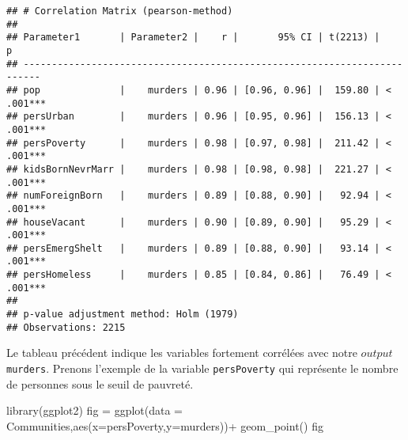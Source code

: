 \documentclass[
]{book}
\newenvironment{Shaded}{\begin{snugshade}}{\end{snugshade}}
\newcommand{\AttributeTok}[1]{\textcolor[rgb]{0.77,0.63,0.00}{#1}}
\newcommand{\CommentTok}[1]{\textcolor[rgb]{0.56,0.35,0.01}{\textit{#1}}}
\newcommand{\FloatTok}[1]{\textcolor[rgb]{0.00,0.00,0.81}{#1}}
\newcommand{\FunctionTok}[1]{\textcolor[rgb]{0.00,0.00,0.00}{#1}}
\newcommand{\NormalTok}[1]{#1}
\newcommand{\OtherTok}[1]{\textcolor[rgb]{0.56,0.35,0.01}{#1}}
\newcommand{\SpecialCharTok}[1]{\textcolor[rgb]{0.00,0.00,0.00}{#1}}
\newcommand{\StringTok}[1]{\textcolor[rgb]{0.31,0.60,0.02}{#1}}
\begin{document}
\begin{Shaded}
\end{Shaded}

\begin{verbatim}
## # Correlation Matrix (pearson-method)
## 
## Parameter1       | Parameter2 |    r |       95% CI | t(2213) |         p
## -------------------------------------------------------------------------
## pop              |    murders | 0.96 | [0.96, 0.96] |  159.80 | < .001***
## persUrban        |    murders | 0.96 | [0.95, 0.96] |  156.13 | < .001***
## persPoverty      |    murders | 0.98 | [0.97, 0.98] |  211.42 | < .001***
## kidsBornNevrMarr |    murders | 0.98 | [0.98, 0.98] |  221.27 | < .001***
## numForeignBorn   |    murders | 0.89 | [0.88, 0.90] |   92.94 | < .001***
## houseVacant      |    murders | 0.90 | [0.89, 0.90] |   95.29 | < .001***
## persEmergShelt   |    murders | 0.89 | [0.88, 0.90] |   93.14 | < .001***
## persHomeless     |    murders | 0.85 | [0.84, 0.86] |   76.49 | < .001***
## 
## p-value adjustment method: Holm (1979)
## Observations: 2215
\end{verbatim}

Le tableau précédent indique les variables fortement corrélées avec notre \(output\) \texttt{murders}. Prenons l'exemple de la variable \texttt{persPoverty} qui représente le nombre de personnes sous le seuil de pauvreté.\\

\begin{Shaded}
\begin{Highlighting}[]
\FunctionTok{library}\NormalTok{(ggplot2)}
\NormalTok{fig }\OtherTok{=} \FunctionTok{ggplot}\NormalTok{(}\AttributeTok{data =}\NormalTok{ Communities,}\FunctionTok{aes}\NormalTok{(}\AttributeTok{x=}\NormalTok{persPoverty,}\AttributeTok{y=}\NormalTok{murders))}\SpecialCharTok{+}
  \FunctionTok{geom\_point}\NormalTok{()}
\NormalTok{fig}
\end{Highlighting}
\end{Shaded}
\end{document}

